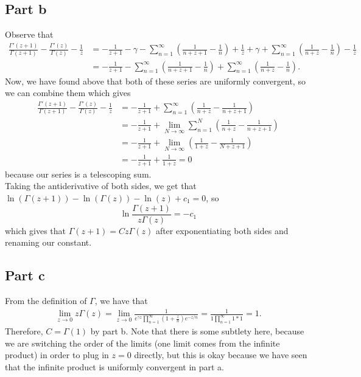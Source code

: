\documentclass{article}
\begin{document}
\subsection{Part b}
Observe that 
\begin{align*}
\frac{\Gamma'(z+1)}{\Gamma(z+1)}-\frac{\Gamma'(z)}{\Gamma(z)}-\frac{1}{z}&=-\frac{1}{z+1}-\gamma-\sum_{n=1}^\infty\left(\frac{1}{n+z+1}-\frac{1}{n}\right)+\frac{1}{z}+\gamma+\sum_{n=1}^\infty\left(\frac{1}{n+z}-\frac{1}{n}\right)-\frac{1}{z}\\&=
-\frac{1}{z+1}-\sum_{n=1}^\infty\left(\frac{1}{n+z+1}-\frac{1}{n}\right)+\sum_{n=1}^\infty\left(\frac{1}{n+z}-\frac{1}{n}\right).
\end{align*}
Now, we have found above that both of these series are uniformly convergent, so we can combine them which gives
\begin{align*}
\frac{\Gamma'(z+1)}{\Gamma(z+1)}-\frac{\Gamma'(z)}{\Gamma(z)}-\frac{1}{z}&=-\frac{1}{z+1}+\sum_{n=1}^\infty\left(\frac{1}{n+z}-\frac{1}{n+z+1}\right)\\&=
-\frac{1}{z+1}+\lim_{N\to\infty}\sum_{n=1}^N\left(\frac{1}{n+z}-\frac{1}{n+z+1}\right)\\&=
-\frac{1}{z+1}+\lim_{N\to\infty}\left(\frac{1}{1+z}-\frac{1}{N+z+1}\right)\\&=
-\frac{1}{z+1}+\frac{1}{1+z}=0
\end{align*}
because our series is a telescoping sum.\\
Taking the antiderivative of both sides, we get that $\ln(\Gamma(z+1))-\ln(\Gamma(z))-\ln(z)+c_1=0$, so 
\[
\ln{\frac{\Gamma(z+1)}{z\Gamma(z)}}=-c_1
\]
which gives that $\Gamma(z+1)=Cz\Gamma(z)$ after exponentiating both sides and renaming our constant. 

\subsection{Part c}  
From the definition of $\Gamma$, we have that 
\begin{align*}
\lim_{z\to0}z\Gamma(z)=\lim_{z\to0}\frac{1}{e^{\gamma z} \prod_{n=1}^\infty \left(1 + \frac{z}{n}\right) e^{-z/n}}=\frac{1}{1\prod_{n=1}^\infty1*1}=1.
\end{align*}
Therefore, $C=\Gamma(1)$ by part b. Note that there is some subtlety here, because we are switching the order of the limits (one limit comes from the infinite product) in order to plug in $z=0$ directly, but this is okay because we have seen that the infinite product is uniformly convergent in part a.
\end{document}
